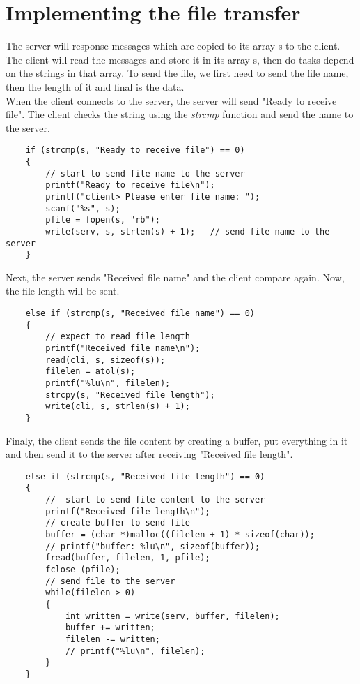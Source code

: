 \documentclass[12pt]{article}
\begin{document}
  \section{Implementing the file transfer}
    The server will response messages which are copied to its array s to the client. The client will read the messages and store it in its array s, then do tasks depend on the strings in that array. To send the file, we first need to send the file name, then the length of it and final is the data.\\
    When the client connects to the server, the server will send "Ready to receive file". The client checks the string using the \textit{strcmp} function and send the name to the server.
    \begin{verbatim}
    if (strcmp(s, "Ready to receive file") == 0)
    {
        // start to send file name to the server
        printf("Ready to receive file\n");
        printf("client> Please enter file name: "); 
        scanf("%s", s);
        pfile = fopen(s, "rb");         
        write(serv, s, strlen(s) + 1);   // send file name to the server
    }
    \end{verbatim}
    Next, the server sends "Received file name" and the client compare again. Now, the file length will be sent.
    \begin{verbatim}
    else if (strcmp(s, "Received file name") == 0)
    {
        // expect to read file length 
        printf("Received file name\n");
        read(cli, s, sizeof(s));
        filelen = atol(s);
        printf("%lu\n", filelen);
        strcpy(s, "Received file length");
        write(cli, s, strlen(s) + 1);
    }
    \end{verbatim}
    Finaly, the client sends the file content by creating a buffer, put everything in it and then send it to the server after receiving "Received file length".
    \begin{verbatim}
    else if (strcmp(s, "Received file length") == 0)
    {
        //  start to send file content to the server 
        printf("Received file length\n");
        // create buffer to send file 
        buffer = (char *)malloc((filelen + 1) * sizeof(char));
        // printf("buffer: %lu\n", sizeof(buffer));
        fread(buffer, filelen, 1, pfile);
        fclose (pfile);
        // send file to the server 
        while(filelen > 0)
        {
            int written = write(serv, buffer, filelen);
            buffer += written;
            filelen -= written;
            // printf("%lu\n", filelen);
        }
    }
    \end{verbatim}
\end{document}
